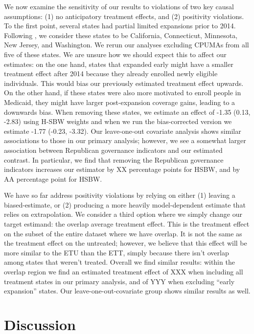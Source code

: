 \documentclass[12pt]{article}
\begin{document}
We now examine the sensitivity of our results to violations of two key causal assumptions: (1) no anticipatory treatment effects, and (2) positivity violations. To the first point, several states had partial limited expansions prior to 2014. Following \cite{frean2017premium}, we consider these states to be California, Connecticut, Minnesota, New Jersey, and Washington. We rerun our analyses excluding CPUMAs from all five of these states. We are unsure how we should expect this to affect our estimates: on the one hand, states that expanded early might have a smaller treatment effect after 2014 because they already enrolled newly eligible individuals. This would bias our previously estimated treatment effect upwards. On the other hand, if these states were also more motivated to enroll people in Medicaid, they might have larger post-expansion coverage gains, leading to a downwards bias. When removing these states, we estimate an effect of -1.35 (0.13, -2.83) using H-SBW weights and when we run the bias-corrected version we estimate -1.77 (-0.23, -3.32). Our leave-one-out covariate analysis shows similar associations to those in our primary analysis; however, we see a somewhat larger association between Republican governance indicators and our estimated contrast. In particular, we find that removing the Republican governance indicators increases our estimator by XX percentage points for HSBW, and by AA percentage point for HSBW. 

We have so far address positivity violations by relying on either (1) leaving a biased-estimate, or (2) producing a more heavily model-dependent estimate that relies on extrapolation. We consider a third option where we simply change our target estimand: the overlap average treatment effect. This is the treatment effect on the subset of the entire dataset where we have overlap. It is not the same as the treatment effect on the untreated; however, we believe that this effect will be more similar to the ETU than the ETT, simply because there isn't overlap among states that weren't treated. Overall we find similar results: within the overlap region we find an estimated treatment effect of XXX when including all treatment states in our primary analysis, and of YYY when excluding ``early expansion'' states. Our leave-one-out-covariate group shows similar results as well. 

\section{Discussion}
\end{document}
